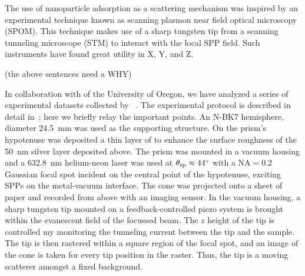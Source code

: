 The use of nanoparticle adsorption as a scattering mechanism was inspired
by an experimental technique known as scanning plasmon near field optical
microscopy (SPOM).  This technique makes use of a sharp tungsten tip from a
scanning tunneling microscope (STM) to interact with the local SPP field.
Such instruments have found great utility in X, Y, and Z.

(the above sentences need a WHY)

In collaboration with  of the University of Oregon, we have
analyzed a series of experimental datasets collected by
~\cite{schumann2009surface}.  The experimental protocol is
described in detail in~\cite{schumann2009surface}; here we briefly relay
the important points.  An N-BK7 hemisphere, diameter
\SI{24.5}{\milli\meter} was used as the supporting structure.  On the
prism's hypotenuse was deposited a thin layer of  to enhance the
surface roughness of the \SI{50}{\nano\meter} silver layer deposited above.
The prism was mounted in a vacuum housing and a \SI{632.8}{\nano\meter}
helium-neon laser was used at $\theta_\mathrm{sp}\approx\SI{44}{\degree}$ with a
$\mathrm{NA}=0.2$ Gaussian focal spot incident on the central point of the
hypotenuse, exciting SPPs on the metal-vacuum interface.  The cone was
projected onto a sheet of paper and recorded from above with an imaging
sensor.  In the vacuum housing, a sharp tungsten tip mounted on a
feedback-controlled piezo system is brought within the evanescent field of
the focussed beam.  The $z$ height of the tip is controlled my monitoring
the tunneling current between the tip and the sample.  The tip is then
rastered within a square region of the focal spot, and an image of the cone
is taken for every tip position in the raster.  Thus, the tip is a moving
scatterer amongst a fixed background.

